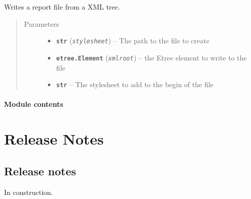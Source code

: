 \documentclass[a4paper,10pt,english]{sphinxmanual}
\begin{document}
\begin{fulllineitems}
\label{commands/apidoc/src:src.xmlManager.write_report}
Writes a report file from a XML tree.
\begin{quote}\begin{description}
\item[{Parameters}] \leavevmode\begin{itemize}
\item {} 
\textbf{\texttt{str}} (\emph{\texttt{stylesheet}}) -- The path to the file to create

\item {} 
\textbf{\texttt{etree.Element}} (\emph{\texttt{xmlroot}}) -- the Etree element to write to the file

\item {} 
\textbf{\texttt{str}} -- The stylesheet to add to the begin of the file

\end{itemize}

\end{description}\end{quote}

\end{fulllineitems}



\subsubsection{Module contents}
\label{commands/apidoc/src:module-src}\label{commands/apidoc/src:module-contents}

\chapter{Release Notes}
\label{index:release-notes}

\section{Release notes}
\label{release_notes/release_notes_5.0.0:release-notes}\label{release_notes/release_notes_5.0.0::doc}
In construction.
\end{document}
